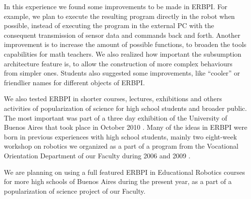 In this experience we found some improvements to be made in ERBPI. For example, we plan to execute the resulting program directly in the robot when possible, instead of executing the program in the external PC with the consequent transmission of sensor data and commands back and forth. Another improvement is to increase the amount of possible functions, to broaden the tools capabilities for math teachers. We also realized how important the subsumption architecture feature is, to allow the construction of more complex behaviours from simpler ones. Students also suggested some improvements, like ``cooler'' or friendlier names for different objects of ERBPI. %

We also tested ERBPI in shorter courses, lectures, exhibitions and others activities of popularization of science for high school students and broader public. The most important was part of a three day exhibition of the University of Buenos Aires that took place in October 2010 \cite{expouba}. Many of the ideas in ERBPI were born in previous experiences with high school students, mainly two eight-week workshop on robotics we organized as a part of a program from the Vocational Orientation Department of our Faculty during 2006 \cite{taller2006} and 2009 \cite{taller2009}. 

We are planning on using a full featured ERBPI in Educational Robotics courses for more high schools of Buenos Aires during the present year, as a part of a popularization of science project of our Faculty. 
